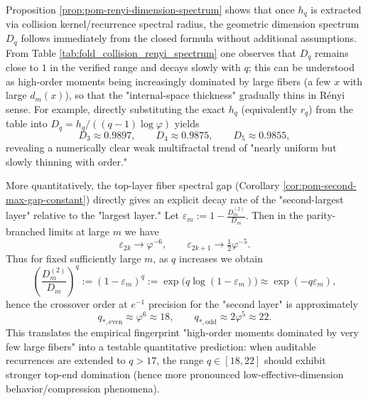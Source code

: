 \begin{remark}\label{rem:pom-renyi-dimension-values}
Proposition \ref{prop:pom-renyi-dimension-spectrum} shows that once \(h_q\) is extracted via collision kernel/recurrence spectral radius, the geometric dimension spectrum \(D_q\) follows immediately from the closed formula without additional assumptions.
From Table \ref{tab:fold_collision_renyi_spectrum} one observes that \(D_q\) remains close to \(1\) in the verified range and decays slowly with \(q\); this can be understood as high-order moments being increasingly dominated by large fibers (a few \(x\) with large \(d_m(x)\)), so that the "internal-space thickness" gradually thins in Rényi sense.
For example, directly substituting the exact \(h_q\) (equivalently \(r_q\)) from the table into
\(
D_q=h_q/((q-1)\log\varphi)
\)
yields
\[
D_3\approx 0.9897,\qquad D_4\approx 0.9875,\qquad D_5\approx 0.9855,
\]
revealing a numerically clear weak multifractal trend of "nearly uniform but slowly thinning with order."
\par
More quantitatively, the top-layer fiber spectral gap (Corollary \ref{cor:pom-second-max-gap-constant}) directly gives an explicit decay rate of the "second-largest layer" relative to the "largest layer."
Let
\(
\varepsilon_m:=1-\frac{D_m^{(2)}}{D_m}
\).
Then in the parity-branched limits at large \(m\) we have
\[
\varepsilon_{2k}\to \varphi^{-6},
\qquad
\varepsilon_{2k+1}\to \tfrac12\varphi^{-5}.
\]
Thus for fixed sufficiently large \(m\), as \(q\) increases we obtain
\[
\left(\frac{D_m^{(2)}}{D_m}\right)^q
:=(1-\varepsilon_m)^q
:=\exp\!\bigl(q\log(1-\varepsilon_m)\bigr)
\approx \exp(-q\varepsilon_m),
\]
hence the crossover order at \(e^{-1}\) precision for the "second layer" is approximately
\[
q_{\ast,\mathrm{even}}\approx \varphi^{6}\approx 18,
\qquad
q_{\ast,\mathrm{odd}}\approx 2\varphi^{5}\approx 22.
\]
This translates the empirical fingerprint "high-order moments dominated by very few large fibers" into a testable quantitative prediction: when auditable recurrences are extended to \(q>17\), the range \(q\in[18,22]\) should exhibit stronger top-end domination (hence more pronounced low-effective-dimension behavior/compression phenomena).
\end{remark}



